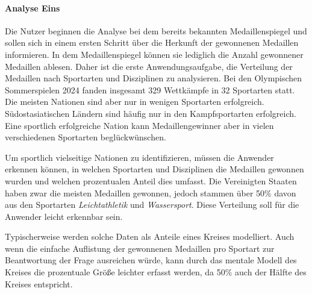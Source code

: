 \paragraph{Analyse Eins}
Die Nutzer beginnen die Analyse bei dem bereits bekannten Medaillenspiegel und sollen sich in einem ersten Schritt über die Herkunft der gewonnenen Medaillen informieren. In dem Medaillenspiegel können sie lediglich die Anzahl gewonnener Medaillen ablesen. Daher ist die erste Anwendungsaufgabe, die Verteilung der Medaillen nach Sportarten und Disziplinen zu analysieren. Bei den Olympischen Sommerspielen 2024 fanden insgesamt 329 Wettkämpfe in 32 Sportarten statt. Die meisten Nationen sind aber nur in wenigen Sportarten erfolgreich. Südostasiatischen Ländern sind häufig nur in den Kampfsportarten erfolgreich. Eine sportlich erfolgreiche Nation kann Medaillengewinner aber in vielen verschiedenen Sportarten beglückwünschen.

Um sportlich vielseitige Nationen zu identifizieren, müssen die Anwender erkennen können, in welchen Sportarten und Disziplinen die Medaillen gewonnen wurden und welchen prozentualen Anteil dies umfasst. Die Vereinigten Staaten haben zwar die meisten Medaillen gewonnen, jedoch stammen über 50\% davon aus den Sportarten \textit{Leichtathletik} und \textit{Wassersport}. Diese Verteilung soll für die Anwender leicht erkennbar sein.

Typischerweise werden solche Daten als Anteile eines Kreises modelliert. Auch wenn die einfache Auflistung der gewonnenen Medaillen pro Sportart zur Beantwortung der Frage ausreichen würde, kann durch das mentale Modell des Kreises die prozentuale Größe leichter erfasst werden, da 50\% auch der Hälfte des Kreises entspricht.

